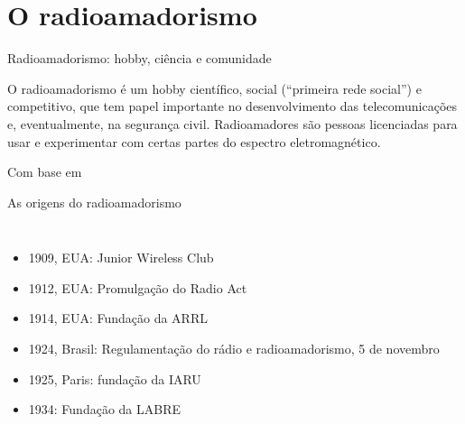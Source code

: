 
\section{O radioamadorismo}

\begin{frame}{Radioamadorismo: hobby, ciência e comunidade}
  \begin{dica}
    O radioamadorismo é um \alert<1>{hobby científico}, \alert<2>{social} (“primeira rede social”) e \alert<3>{competitivo}, que tem papel importante no \alert<4>{desenvolvimento das telecomunicações} e, eventualmente, na \alert<4>{segurança civil}. \alert<5>{Radioamadores} são pessoas \alert<5>{licenciadas para usar e experimentar} com certas partes do espectro eletromagnético.

    \raggedleft
    \small
    \smallskip
    Com base em \citet{iaru2020}
  \end{dica}
\end{frame}

\begin{frame}{As origens do radioamadorismo}
  \begin{columns}
    \begin{itemize}[<+->]
    \item 1909, EUA: \alert<1>{Junior Wireless Club}
    \item 1912, EUA: Promulgação do \alert<2>{Radio Act}
    \item 1914, EUA: Fundação da \alert<3>{ARRL}
    \item 1924, Brasil: \alert<4>{Regulamentação do rádio} e radioamadorismo, 5 de novembro
    \item 1925, Paris: fundação da \alert<5>{IARU}
    \item 1934: Fundação da \alert<6>{LABRE}
    \end{itemize}

  \end{columns}
\end{frame}

